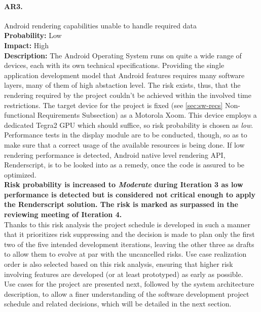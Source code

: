 		\paragraph{AR3.}Android rendering capabilities unable to handle required data\\
		\textbf{Probability:} Low\\
		\textbf{Impact:} High\\
		\textbf{Description:} The Android Operating System runs on quite a wide range of devices, each with its own technical specifications. Providing the single application development model that Android features requires many software layers, many of them of high abstaction level. The risk exists, thus, that the rendering required by the project couldn't be achieved within the involved time restrictions. The target device for the project is fixed (see \autoref{sec:sw-recs} Non-functional Requirements Subsection) as a Motorola Xoom. This device employs a dedicated Tegra2 GPU  which should suffice, so risk probability is chosen as \emph{low}. Performance tests in the display module are to be conducted, though, so as to make sure that a correct usage of the available resources is being done. 
		If low rendering performance is detected, Android native level rendering API, Renderscript, is to be looked into as a remedy, once the code is assured to be optimized.
		\\
		\textbf{Risk probability is increased to \emph{Moderate} during Iteration 3 as low performance is detected but is considered not critical enough to apply the Renderscript solution. The risk is marked as surpassed in the reviewing meeting of Iteration 4.}\\

		Thanks to this risk analysis the project schedule is developed in such a manner that it prioritizes risk suppressing and the decision is made to plan only the first two of the five intended development iterations, leaving the other three as drafts to allow them to evolve at par with the uncancelled risks.
		Use case realization order is also selected based on this risk analysis, ensuring that higher risk involving features are developed (or at least prototyped) as early as possible.\\
		
		Use cases for the project are presented next, followed by the system architecture description, to allow a finer understanding of the software development project schedule and related decisions, which will be detailed in the next section.
	
